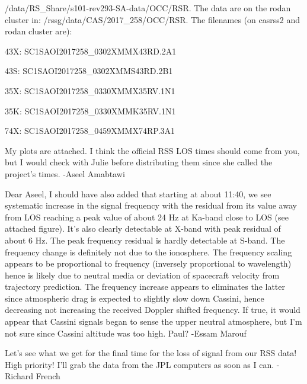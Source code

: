\documentclass[crop=false,class=article,oneside]{standalone}
\begin{document}
/data/RS\_Share/s101-rev293-SA-data/OCC/RSR. The data are on the rodan cluster in: /rssg/data/CAS/2017\_258/OCC/RSR. The filenames (on casrss2 and rodan cluster are):
\begin{itemize}
\begin{multicols}{2}
    \item 43X: SC1SAOI2017258\_0302XMMX43RD.2A1
    \item 43S: SC1SAOI2017258\_0302XMMS43RD.2B1
    \item 35X: SC1SAOI2017258\_0330XMMX35RV.1N1
    \item 35K: SC1SAOI2017258\_0330XMMK35RV.1N1
    \item 74X: SC1SAOI2017258\_0459XMMX74RP.3A1
\end{multicols}
\end{itemize}
My plots are attached. I think the official RSS LOS times should come from you, but I would check with Julie before distributing them since she called the project's times. -Aseel Amabtawi\par
Dear Aseel, I should have also added that starting at about 11:40, we see systematic increase in the signal frequency with the residual from its value away from LOS reaching a peak value of about 24 Hz at Ka-band close to LOS (see attached figure).  It’s also clearly detectable at X-band with peak residual of about 6 Hz. The peak frequency residual is hardly detectable at S-band. The frequency change is definitely not due to the ionosphere. The frequency scaling appears to be proportional to frequency (inversely proportional to wavelength) hence is likely due to neutral media or deviation of spacecraft velocity from trajectory prediction.  The frequency increase appears to eliminates the latter since atmospheric drag is expected to slightly slow down Cassini, hence decreasing not increasing the received Doppler shifted frequency. If true, it would appear that Cassini signals began to sense the upper neutral  atmosphere, but I’m not sure since Cassini altitude was too high.  Paul? -Essam Marouf\par
Let's see what we get for the final time for the loss of signal from our RSS data! High priority! I'll grab the data from the JPL computers as soon as I can. -Richard French
\end{document}
